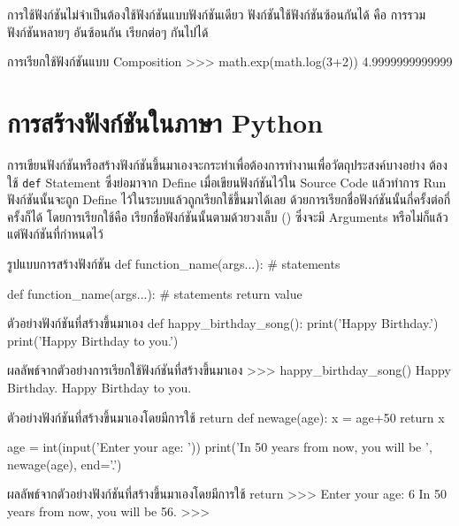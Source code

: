 การใช้ฟังก์ชันไม่จำเป็นต้องใช้ฟังก์ชันแบบฟังก์ชันเดียว ฟังก์ชันใช้ฟังก์ชันซ้อนกันได้ คือ การรวมฟังก์ชันหลายๆ อันซ้อนกัน เรียกต่อๆ กันไปได้

\begin{codelist}{การเรียกใช้ฟังก์ชันแบบ Composition}{}
>>> math.exp(math.log(3+2))
4.9999999999999
\end{codelist}

\section{การสร้างฟังก์ชันในภาษา Python}

การเขียนฟังก์ชันหรือสร้างฟังก์ชันขึ้นมาเองจะกระทำเพื่อต้องการทำงานเพื่อวัตถุประสงค์บางอย่าง ต้องใช้ \texttt{def} Statement ซึ่งย่อมาจาก Define เมื่อเขียนฟังก์ชันไว้ใน Source Code แล้วทำการ Run ฟังก์ชันนั้นจะถูก Define ไว้ในระบบแล้วถูกเรียกใช้ขึ้นมาได้เลย ด้วยการเรียกชื่อฟังก์ชันนั้นกี่ครั้งต่อกี่ครั้งก็ได้ โดยการเรียกใช้คือ เรียกชื่อฟังก์ชันนั้นตามด้วยวงเล็บ () ซึ่งจะมี Arguments หรือไม่ก็แล้วแต่ฟังก์ชันที่กำหนดไว้

\begin{codelist}{รูปแบบการสร้างฟังก์ชัน}{}
def function_name(args...):
    # statements

def function_name(args...):
    # statements
    return value
\end{codelist}


\begin{codelist}{ตัวอย่างฟังก์ชันที่สร้างขึ้นมาเอง}{}
def happy_birthday_song():
    print('Happy Birthday.')
    print('Happy Birthday to you.')
\end{codelist}

\begin{codelist}{ผลลัพธ์จากตัวอย่างการเรียกใช้ฟังก์ชันที่สร้างขึ้นมาเอง}{}
>>>  happy_birthday_song()
Happy Birthday.
Happy Birthday to you.
\end{codelist}

\begin{codelist}{ตัวอย่างฟังก์ชันที่สร้างขึ้นมาเองโดยมีการใช้ return}{}
def newage(age):
    x = age+50
    return x

age = int(input('Enter your age: '))
print('In 50 years from now, you will be ', newage(age), end='.')
\end{codelist}

\begin{codelist}{ผลลัพธ์จากตัวอย่างฟังก์ชันที่สร้างขึ้นมาเองโดยมีการใช้ return}{}
>>>
Enter your age: 6
In 50 years from now, you will be  56.
>>> 
\end{codelist}


